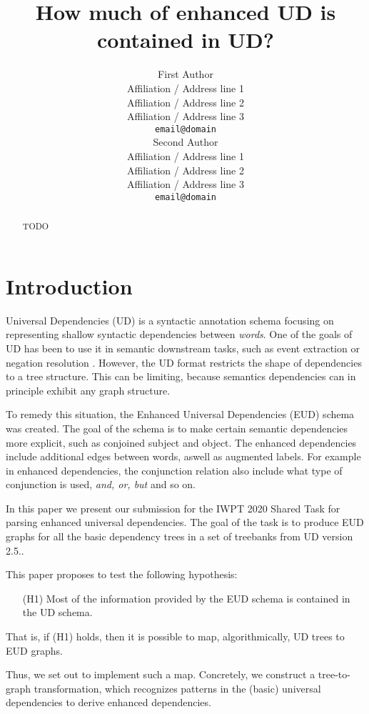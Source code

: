 \documentclass[11pt,a4paper]{article}
\title{How much of enhanced UD is contained in UD?}
\author{First Author \\
  Affiliation / Address line 1 \\
  Affiliation / Address line 2 \\
  Affiliation / Address line 3 \\
  \texttt{email@domain} \\\And
  Second Author \\
  Affiliation / Address line 1 \\
  Affiliation / Address line 2 \\
  Affiliation / Address line 3 \\
  \texttt{email@domain} \\}
\date{}
\begin{document}
\maketitle
\begin{abstract}
  TODO
\end{abstract}

\section{Introduction}
Universal Dependencies (UD) is a syntactic annotation schema
focusing on representing shallow syntactic dependencies between
\emph{words}. One of the goals of UD has been to use it in
semantic downstream tasks, such as event extraction
\citep{fares20182018, mcclosky2011event}  or
negation resolution \citep{fares20182018}.
%
However, the UD format restricts the shape of dependencies to a tree
structure.  This can be limiting, because semantics dependencies can
in principle exhibit any graph structure.

To remedy this situation, the Enhanced Universal
Dependencies (EUD) schema was created. The goal of the schema is
to make certain semantic dependencies more explicit, such as
conjoined subject and object. The enhanced dependencies include
additional edges between words, aswell as augmented labels. For
example in enhanced dependencies, the conjunction relation also
include what type of conjunction is used, \textit{and, or, but}
and so on.

In this paper we present our submission for the IWPT 2020 Shared
Task for parsing enhanced universal dependencies. The goal of the
task is to produce EUD graphs for all the basic dependency trees
in a set of treebanks from UD version 2.5..

This paper proposes to test the following hypothesis:
\begin{enumerate}
\item[(H1)] Most of the information provided by the EUD schema is
  contained in the UD schema.
\end{enumerate}

That is, if (H1) holds, then it is possible to map, algorithmically,
UD trees to EUD graphs.

Thus, we set out to implement such a map. Concretely, we construct  a
tree-to-graph transformation, which recognizes patterns in the (basic)
universal dependencies to derive enhanced dependencies.
\end{document}
